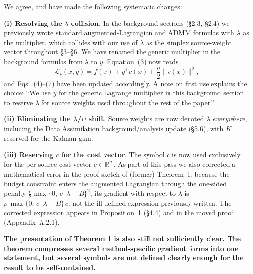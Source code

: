 \documentclass{article}
\newenvironment{QandA}{\begin{enumerate}[label=\bfseries\alph*.]\bfseries}
                      {\end{enumerate}}
\newenvironment{answered}{\par\normalfont}{}
\begin{document}
\begin{answered}
We agree, and have made the following systematic changes:

\textbf{(i) Resolving the $\lambda$ collision.}
In the background sections (\S2.3, \S2.4) we previously wrote standard
augmented-Lagrangian and ADMM formulas with $\lambda$ as the multiplier,
which collides with our use of $\lambda$ as the simplex source-weight vector
throughout \S3--\S6. We have renamed the generic multiplier in the background
formulas from $\lambda$ to $y$. Equation~(3) now reads
\[
    \mathcal{L}_\rho(x, y) = f(x) + y^\top c(x) + \frac{\rho}{2}\|c(x)\|^2,
\]
and Eqs.~(4)--(7) have been updated accordingly. A note on first use
explains the choice:
``We use $y$ for the generic Lagrange multiplier in this background section to reserve $\lambda$ for source weights used throughout the rest of the paper.''

\textbf{(ii) Eliminating the $\lambda$/$w$ shift.}
Source weights are now denoted $\lambda$ \emph{everywhere}, including the
Data Assimilation background/analysis update (\S5.6), with $K$ reserved for
the Kalman gain.

\textbf{(iii) Reserving $c$ for the cost vector.}
The symbol $c$ is now used exclusively for the per-source cost vector
$c \in \mathbb{R}^n_+$. As part of this pass we also
corrected a mathematical error in the proof sketch of (former) Theorem~1:
because the budget constraint enters the augmented Lagrangian through the
one-sided penalty $\tfrac{\rho}{2}\max\{0,\,c^\top\lambda - B\}^2$,
its gradient with respect to $\lambda$ is $\rho\,\max\{0,\,c^\top\lambda - B\}\,c$,
not the ill-defined expression previously written. The corrected expression
appears in Proposition~1 (\S4.4) and in the moved proof (Appendix~A.2.1).
\end{answered}

\begin{QandA}
The presentation of Theorem 1 is also still not sufficiently clear. The theorem compresses several method-specific gradient forms into one statement, but several symbols are not defined clearly enough for the result to be self-contained.
\end{QandA}
\end{document}
